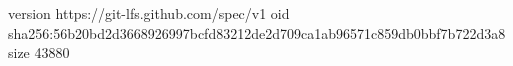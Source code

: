 version https://git-lfs.github.com/spec/v1
oid sha256:56b20bd2d3668926997bcfd83212de2d709ca1ab96571c859db0bbf7b722d3a8
size 43880
